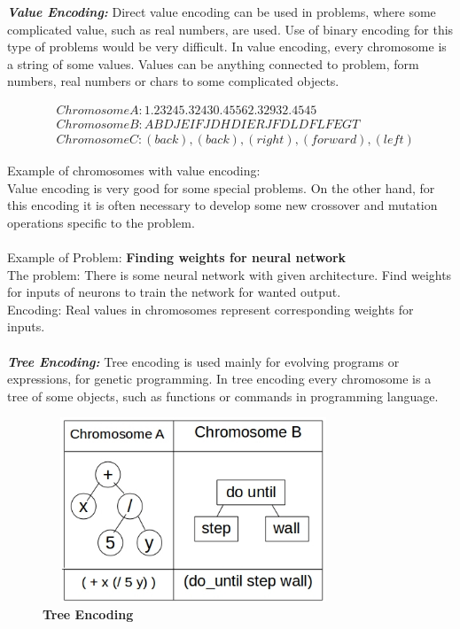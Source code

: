 \documentclass[a4paper, 12pt]{article}
\begin{document}
\textbf{\textit{Value Encoding: }}
Direct value encoding can be used in problems, where some complicated value, such as real numbers, are used. Use of binary encoding for this
type of problems would be very difficult. In value encoding, every chromosome is a string of some values. Values can be anything connected to 
problem, form numbers, real numbers or chars to some complicated objects.
\begin{center}
\begin{align*}
&Chromosome A: 1.2324  5.3243  0.4556  2.3293  2.4545\\
&Chromosome B: ABDJEIFJDHDIERJFDLDFLFEGT\\
&Chromosome C: (back), (back), (right), (forward), (left)
\end{align*}
\end{center}
Example of chromosomes with value encoding:\\
Value encoding is very good for some special problems. On the other hand, for this encoding it is often necessary to develop some new crossover and mutation operations specific to the problem.\\~\\
Example of Problem: \textbf{Finding weights for neural network}\\
The problem: There is some neural network with given architecture. Find weights for inputs of neurons to train the network for wanted output.\\
Encoding: Real values in chromosomes represent corresponding weights for inputs.\\~\\
\textbf{\textit{Tree Encoding: }}
Tree encoding is used mainly for evolving programs or expressions, for genetic programming. In tree encoding every chromosome is a tree of some objects, such as functions or commands in programming language. 
\begin{figure}[h]
\centering
\includegraphics[width=90mm,height=55mm]{./treeenc.jpg}
\caption{\textbf{Tree Encoding}}
\label{fig 9}
\end{figure}
\end{document}

